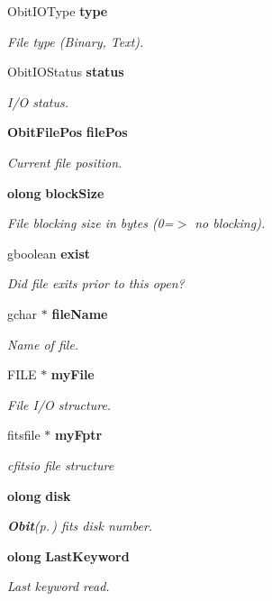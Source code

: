 \begin{CompactItemize}
Obit\-IOType {\bf type}
\begin{CompactList}\small\item\em File type (Binary, Text). \item\end{CompactList}\item 
Obit\-IOStatus {\bf status}
\begin{CompactList}\small\item\em I/O status. \item\end{CompactList}\item 
{\bf Obit\-File\-Pos} {\bf file\-Pos}
\begin{CompactList}\small\item\em Current file position. \item\end{CompactList}\item 
{\bf olong} {\bf block\-Size}
\begin{CompactList}\small\item\em File blocking size in bytes (0=$>$ no blocking). \item\end{CompactList}\item 
gboolean {\bf exist}
\begin{CompactList}\small\item\em Did file exits prior to this open? \item\end{CompactList}\item 
gchar $\ast$ {\bf file\-Name}
\begin{CompactList}\small\item\em Name of file. \item\end{CompactList}\item 
FILE $\ast$ {\bf my\-File}
\begin{CompactList}\small\item\em File I/O structure. \item\end{CompactList}\item 
fitsfile $\ast$ {\bf my\-Fptr}
\begin{CompactList}\small\item\em cfitsio file structure \item\end{CompactList}\item 
{\bf olong} {\bf disk}
\begin{CompactList}\small\item\em {\bf Obit}{\rm (p.\,\pageref{structObit})} fits disk number. \item\end{CompactList}\item 
{\bf olong} {\bf Last\-Keyword}
\begin{CompactList}\small\item\em Last keyword read. \item\end{CompactList}\end{CompactItemize}


